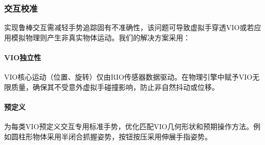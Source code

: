 \documentclass[runningheads]{llncs}
\begin{document}
\subsubsection{交互校准}
实现鲁棒交互需减轻手势追踪固有不准确性，该问题可导致虚拟手穿透VIO或若应用模拟物理则产生非真实物体运动。我们的解决方案采用：

\paragraph{VIO独立性} VIO核心运动（位置、旋转）仅由RIO传感器数据驱动。在物理引擎中赋予VIO无限质量，确保其不受意外虚拟手碰撞影响，防止非自然抖动或位移。

\paragraph{预定义} 为每类VIO预定义交互专用标准手势，优化匹配VIO几何形状和预期操作方法。例如圆柱形物体采用半闭合抓握姿势，按钮按压采用伸展手指姿势。
\end{document}
